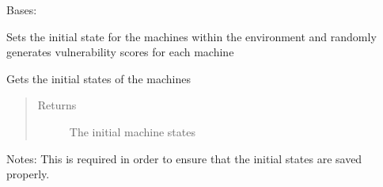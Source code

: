 \documentclass[letterpaper,10pt,english]{sphinxmanual}
\begin{document}
\begin{fulllineitems}
\label{\detokenize{source/yawning_titan.envs.specific.core:yawning_titan.envs.specific.core.machines.Machines}}
\sphinxAtStartPar
Bases: 

\sphinxAtStartPar
Sets the initial state for the machines within the environment and
randomly generates vulnerability scores for each machine

\begin{fulllineitems}
\label{\detokenize{source/yawning_titan.envs.specific.core:yawning_titan.envs.specific.core.machines.Machines.get_initial_state}}
\sphinxAtStartPar
Gets the initial states of the machines
\begin{quote}\begin{description}
\item[{Returns}] \leavevmode
\sphinxAtStartPar
The initial machine states

\end{description}\end{quote}

\sphinxAtStartPar
Notes: This is required in order to ensure that the initial
states are saved properly.

\end{fulllineitems}



\end{fulllineitems}
\end{document}
